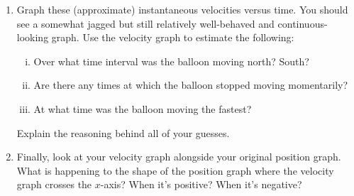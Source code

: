 \begin{enumerate}[\bf {\thesection}a.]
	\item Graph these (approximate) instantaneous velocities versus time. You should see a somewhat jagged but still relatively well-behaved and continuous-looking graph. Use the velocity graph to estimate the following:
	\begin{enumerate}[i.]
		\item Over what time interval was the balloon moving north? South?
		\item Are there any times at which the balloon stopped moving momentarily?
		\item At what time was the balloon moving the fastest?
	\end{enumerate}
	
	Explain the reasoning behind all of your guesses.
	
	\item Finally, look at your velocity graph alongside your original position graph. What is happening to the shape of the position graph where the velocity graph crosses the $x$-axis? When it's positive? When it's negative?
\end{enumerate}
